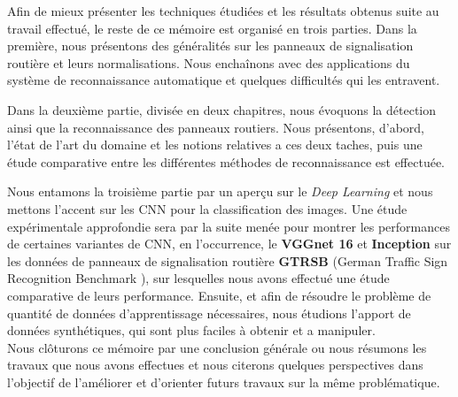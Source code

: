 Afin de mieux présenter les techniques étudiées et les résultats obtenus suite au travail effectué, le reste de ce mémoire est organisé en trois parties. Dans la première, nous présentons des généralités sur les panneaux de signalisation routière et leurs normalisations. Nous enchaînons avec des applications du système de reconnaissance automatique et quelques difficultés qui les entravent.

Dans la deuxième partie, divisée en deux chapitres, nous évoquons la détection ainsi que la reconnaissance des panneaux routiers. Nous présentons, d'abord,  l'état de l’art du domaine et les notions relatives a ces deux taches, puis une étude comparative entre les différentes méthodes de reconnaissance est effectuée. 

Nous entamons la troisième partie par un aperçu sur le \emph{Deep Learning} et nous mettons l’accent sur les CNN pour la classification des images. Une étude expérimentale approfondie sera par la suite menée pour montrer les performances de certaines variantes de CNN, en l'occurrence, le  \textbf{VGGnet 16} \cite{simonyan2014very} et \textbf{Inception} \cite{43022} sur les données de panneaux de signalisation routière \textbf{GTRSB} (German Traffic Sign Recognition Benchmark \cite{Stallkamp2012}), sur lesquelles nous avons effectué une étude comparative de leurs performance. Ensuite, et afin de résoudre le problème de quantité de données d'apprentissage nécessaires, nous étudions l'apport de données synthétiques, qui sont  plus faciles à obtenir et a manipuler.\\ 

Nous clôturons ce mémoire par une conclusion générale ou nous résumons les travaux que nous avons effectues et nous citerons quelques perspectives dans l'objectif de l’améliorer et d'orienter futurs travaux sur la même problématique.





 

